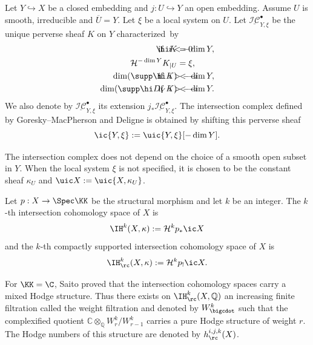 \begin{definition}\label{def_intersection_complex}
Let $Y\hookrightarrow X$ be a closed embedding and $j:U\hookrightarrow Y$ an open embedding. Assume $U$ is smooth, irreducible and $\overline U = Y$. Let $\xi$ be a local system on $U$. Let $\underline{\mathcal{I C}}_{Y,\xi}^\bullet$ be the unique perverse sheaf $K$ on $Y$ characterized~by
\begin{align*}
\hi K &= 0 &&\hspace*{-2cm}\text{if \ } i < -\dim Y,\\
\mathcal{H}^{-\dim Y} K_{| U}&=\xi,\\
\dim(\supp \hi K) &< -i &&\hspace*{-2cm}\text{if \ } i > -\dim Y, \\
\dim(\supp \hi D_Y K) &< -i &&\hspace*{-2cm}\text{if \ } i > -\dim Y.
\end{align*}
We also denote by $\underline{\mathcal{I C}}_{Y,\xi}^\bullet$ its extension $j_*\underline{\mathcal{I C}}_{Y,\xi}^\bullet$. The intersection complex defined by Goresky--MacPherson \cite{Goresky_MacPherson} and Deligne is obtained by shifting this perverse sheaf
\[
\ic{Y,\xi}:=\uic{Y,\xi}[-\dim Y].
\]
\end{definition}

\begin{remark}
The intersection complex does not depend on the choice of a smooth open subset in $Y$. When the local system $\xi$ is not specified, it is chosen to be the constant sheaf $\kappa_U$ and $\uic X := \uic {X,\kappa_U}$.
\end{remark}

\begin{definition}
Let $p:X\to \Spec \KK$ be the structural morphism and let $k$ be an integer. The $k$-th intersection cohomology space of $X$ is
\[
\IH^k(X,\kappa) := \mathcal{H}^k p_* \ic X
\]
and the $k$-th compactly supported intersection cohomology space of $X$ is
\[
\IH^k_\rc (X,\kappa) := \mathcal{H}^k p_! \ic X.
\]

\end{definition}

For $\KK=\C$, Saito \cite{Saito1986} proved that the intersection cohomology spaces carry a mixed Hodge structure. Thus there exists on $\IH_{\rc}^k(X,\mathbb{Q})$ an increasing finite filtration called the weight filtration and denoted by $W^k_{\bigcdot}$ such that the complexified quotient $\mathbb{C}\otimes_{\mathbb{Q}}W^k_{r}/ W^k_{r-1}$ carries a pure Hodge structure of weight $r$. The Hodge numbers of this structure are denoted by $h_\rc ^{i,j,k}(X)$.

